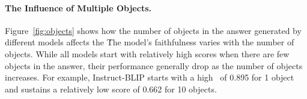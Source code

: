 \paragraph{The Influence of Multiple Objects.}
Figure~\ref{fig:objects} shows how the number of objects in the answer generated by different models affects the  \ours\. 
The model's faithfulness varies with the number of objects. While all models start with relatively high scores when there are few objects in the answer, their performance generally drop as the number of objects increases. For example, Instruct-BLIP starts with a high \ours\ of 0.895 for 1 object and sustains a relatively low score of 0.662 for 10 objects.



